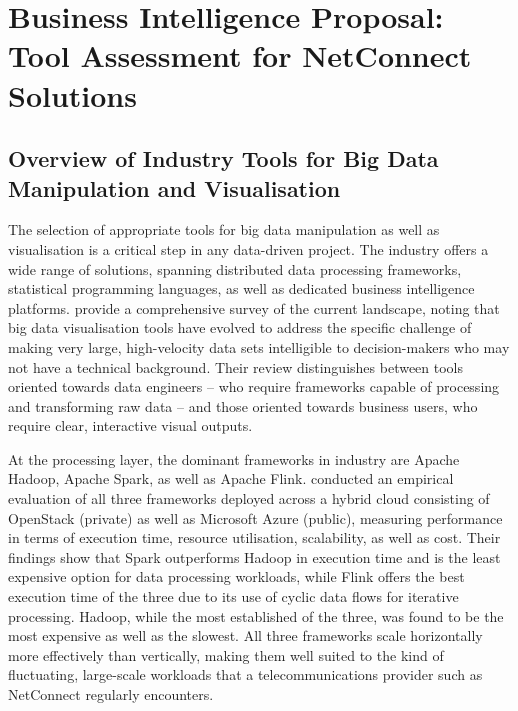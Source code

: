 \documentclass[12pt,a4paper]{article}
\begin{document}
\newpage
\section{Business Intelligence Proposal: Tool Assessment for NetConnect Solutions}

\subsection{Overview of Industry Tools for Big Data Manipulation and Visualisation}

The selection of appropriate tools for big data manipulation as well as visualisation is a critical step in any data-driven project. The industry offers a wide range of solutions, spanning distributed data processing frameworks, statistical programming languages, as well as dedicated business intelligence platforms. \textcite{Gahar2024} provide a comprehensive survey of the current landscape, noting that big data visualisation tools have evolved to address the specific challenge of making very large, high-velocity data sets intelligible to decision-makers who may not have a technical background. Their review distinguishes between tools oriented towards data engineers -- who require frameworks capable of processing and transforming raw data -- and those oriented towards business users, who require clear, interactive visual outputs.

At the processing layer, the dominant frameworks in industry are Apache Hadoop, Apache Spark, as well as Apache Flink. \textcite{Ullah2022} conducted an empirical evaluation of all three frameworks deployed across a hybrid cloud consisting of OpenStack (private) as well as Microsoft Azure (public), measuring performance in terms of execution time, resource utilisation, scalability, as well as cost. Their findings show that Spark outperforms Hadoop in execution time and is the least expensive option for data processing workloads, while Flink offers the best execution time of the three due to its use of cyclic data flows for iterative processing. Hadoop, while the most established of the three, was found to be the most expensive as well as the slowest. All three frameworks scale horizontally more effectively than vertically, making them well suited to the kind of fluctuating, large-scale workloads that a telecommunications provider such as NetConnect regularly encounters.
\end{document}
